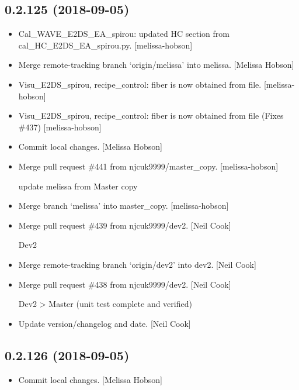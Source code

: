 \documentclass[a4paper,10pt,english]{report}
\begin{document}
\subsection{0.2.125 (2018-09-05)}
\label{\detokenize{misc/changelog:id335}}\begin{itemize}
\item {} 
Cal\_WAVE\_E2DS\_EA\_spirou: updated HC section from
cal\_HC\_E2DS\_EA\_spirou.py. {[}melissa-hobson{]}

\item {} 
Merge remote-tracking branch ‘origin/melissa’ into melissa. {[}Melissa
Hobson{]}

\item {} 
Visu\_E2DS\_spirou, recipe\_control: fiber is now obtained from file.
{[}melissa-hobson{]}

\item {} 
Visu\_E2DS\_spirou, recipe\_control: fiber is now obtained from file
(Fixes \#437) {[}melissa-hobson{]}

\item {} 
Commit local changes. {[}Melissa Hobson{]}

\item {} 
Merge pull request \#441 from njcuk9999/master\_copy. {[}melissa-hobson{]}

update melissa from Master copy

\item {} 
Merge branch ‘melissa’ into master\_copy. {[}melissa-hobson{]}

\item {} 
Merge pull request \#439 from njcuk9999/dev2. {[}Neil Cook{]}

Dev2

\item {} 
Merge remote-tracking branch ‘origin/dev2’ into dev2. {[}Neil Cook{]}

\item {} 
Merge pull request \#438 from njcuk9999/dev2. {[}Neil Cook{]}

Dev2 \textendash{}\textgreater{} Master (unit test complete and verified)

\item {} 
Update version/changelog and date. {[}Neil Cook{]}

\end{itemize}


\subsection{0.2.126 (2018-09-05)}
\label{\detokenize{misc/changelog:id336}}\begin{itemize}
\item {} 
Commit local changes. {[}Melissa Hobson{]}

\end{itemize}
\end{document}

